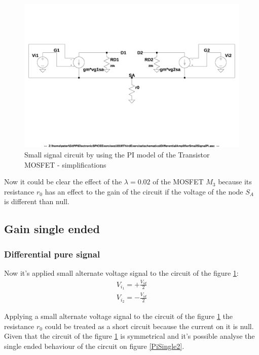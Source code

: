 \documentclass[10pt,a4paper]{book}
\begin{document}
\begin{figure}[h]
  \centering
  \includegraphics[width=12cm]{schematics/DifferentialAmplifierSmallSignalPi.jpg}
  \caption{Small signal circuit by using the PI model of the Transistor MOSFET - simplifications}
  \label{PiSimple}
\end{figure}

Now it could be clear the effect of the $\lambda = 0.02$ of the MOSFET $M_3$ because its resistance $r_0$ has an effect to the gain of the circuit if the voltage of the node $S_A$ is different than null.\par

\subsection{Gain single ended}
\subsubsection{Differential pure signal}
Now it's applied  small alternate voltage signal to the circuit of the figure \ref{PiSimple}:\\
\begin{align}
V_{i_1} =+ \frac{V_{id}}{2} \label{Vi1d}\\
V_{i_2} =- \frac{V_{id}}{2} \label{Vi2d}
\end{align}


Applying a small alternate voltage signal to the circuit of the figure \ref{PiSimple} the resistance $r_0$ could be treated as a short circuit because the current on it is null.\\
Given that the circuit of the figure \ref{PiSimple} is symmetrical and it's possible analyse the single ended behaviour of the circuit on figure \ref{PiSingle2}.\par
\end{document}
